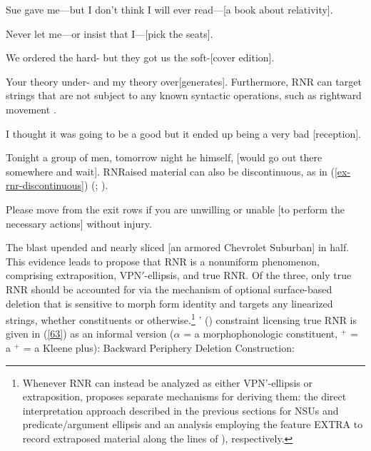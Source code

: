 {\eal
\ex Sue gave me---but I don't think I will ever read---[a book about relativity]. \label{54}

\ex Never let me---or insist that I---[pick the seats].\label{55}

\ex We ordered the hard- but they got us the soft-[cover edition].\label{56}

\ex Your theory under- and my theory over[generates].\label{57}\zl
%
Furthermore, RNR can target strings that are not subject to any known syntactic operations, such as rightward movement \citep[865]{Chaves2014}.

\eal
\ex I thought it was going to be a good but it ended up being a very bad [reception].\label{58}

\ex Tonight a group of men, tomorrow night he himself, [would go out there somewhere and wait].\label{59}\zl
RNRaised material can also be discontinuous, as in (\ref{ex-rnr-discontinuous}) (\citealt[868]{Chaves2014}; \citealt[238--240]{Whitman2009}).

\eal
\label{ex-rnr-discontinuous}
\ex Please move from the exit rows if you are unwilling or unable [to perform the necessary actions] without injury.\label{61}

\ex The blast upended and nearly sliced [an armored Chevrolet Suburban] in half.\label{62}\zl
%
This evidence leads \citet{Chaves2014} to propose that RNR is a nonuniform phenomenon, comprising extraposition,  VP\/N$'$-ellipsis, and true RNR.
%
%
%
Of the three, only true RNR should be accounted for via the mechanism of optional surface-based deletion that is sensitive to morph form identity and targets any linearized strings, whether constituents or otherwise.\footnote{Whenever RNR can instead be analyzed as either VP\/N'-ellipsis or extraposition, \citeauthor{Chaves2014} proposes separate mechanisms for deriving them: the direct interpretation approach described in the previous sections for NSUs and predicate/argument ellipsis and an analysis employing the feature EXTRA to record extraposed material along the lines of \citeauthor{KimSag2005, Kay2012}), respectively.} \citeauthor{Chaves2014}' (\citeyear[874]{Chaves2014}) constraint licensing true RNR is given in (\ref{63}) as an informal version  ($\alpha$
= a morphophonologic constituent, $^{+}$ = a
 $^{+}$ = a Kleene plus):
%
%
%
%
\ea
\label{63}
 Backward Periphery Deletion Construction:\\

}
